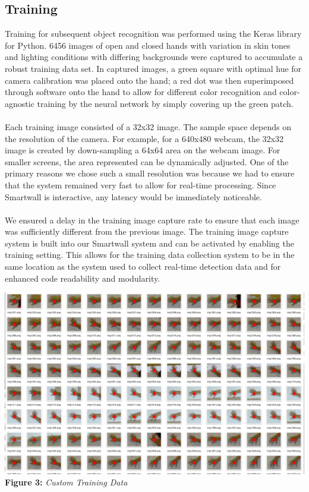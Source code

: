 \documentclass[twoside,twocolumn]{article}
\begin{document}
\subsection{Training}
Training for subsequent object recognition was performed using the Keras library for Python. 6456 images of open and closed hands with variation in skin tones and lighting conditions with differing backgrounds were captured to accumulate a robust training data set. In captured images, a green square with optimal hue for camera calibration was placed onto the hand; a red dot was then superimposed through software onto the hand to allow for different color recognition and color-agnostic training by the neural network by simply covering up the green patch. \\ \\
Each training image consisted of a 32x32 image. The sample space depends on the resolution of the camera. For example, for a 640x480 webcam, the 32x32 image is created by down-sampling a 64x64 area on the webcam image. For smaller screens, the area represented can be dynamically adjusted. One of the primary reasons we chose such a small resolution was because we had to ensure that the system remained very fast to allow for real-time processing. Since Smartwall is interactive, any latency would be immediately noticeable. \\ \\
We ensured a delay in the training image capture rate to ensure that each image was sufficiently different from the previous image. The training image capture system is built into our Smartwall system and can be activated by enabling the training setting. This allows for the training data collection system to be in the same location as the system used to collect real-time detection data and for enhanced code readability and modularity.

\begin{center}
\includegraphics[scale=0.27]{training_data} \\
\vspace{0.25cm}
\small{\textbf{Figure 3:} \textit{Custom Training Data}}
\end{center}
\end{document}
